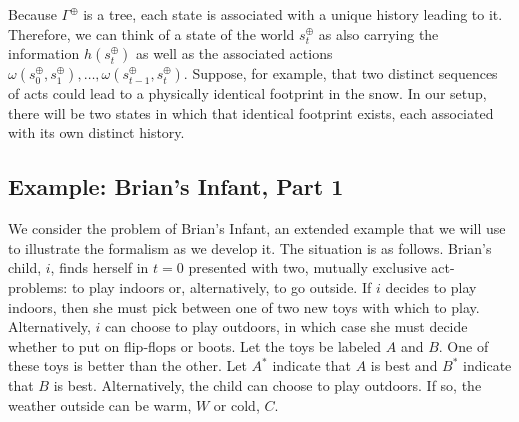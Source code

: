 \documentclass[
11pt,
titlepage,
reqno,
]{article}%
\theoremstyle{definition}
\begin{document}
	Because $\Gamma^\oplus$ is a tree, each state is associated with a unique history leading to it. 
	Therefore, we can think of a state of the world  $s^\oplus_t$ as also carrying the information $h(s^\oplus_t)$ as well as the associated actions $\omega(s^\oplus_0,s^\oplus_1),\ldots,\omega(s^\oplus_{t-1},s^\oplus_t)$. 
	Suppose, for example, that two distinct sequences of acts could lead to a physically identical footprint in the snow.	
	In our setup, there will be two states in which that identical footprint exists, each associated with its own distinct history.
	
	
	
	\subsection{Example: Brian's Infant, Part 1}	
	We consider the problem of Brian's Infant, an extended example that we will use  to illustrate the formalism as we develop it.
	The situation is as follows.
	Brian's child, $i$, finds herself in $t=0$ presented with two, mutually exclusive act-problems: to play indoors or, alternatively, to go outside. 
	If $i$ decides to play indoors, then she must pick between one of two new toys with which to play.
	Alternatively, $i$ can choose to play outdoors, in which case she must decide whether to put on flip-flops or boots.
	Let the toys be labeled $A$ and $B$. 
	One of these toys is better than the other. 
	Let $A^\ast$ indicate that $A$ is best and $B^\ast$ indicate that $B$ is best. 
	Alternatively, the child can choose to play outdoors.
	If so,  the weather outside can be warm, $W$ or cold, $C$.
	
	
\end{document}
